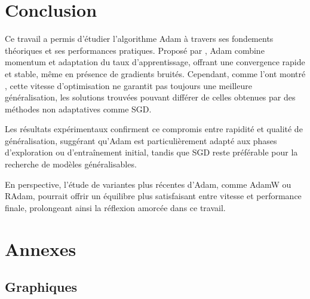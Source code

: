 \documentclass[a4paper,12pt]{article}
\begin{document}
\section{Conclusion}

Ce travail a permis d’étudier l’algorithme Adam à travers ses fondements
théoriques et ses performances pratiques. Proposé par \cite{kingma2014}, Adam combine momentum et adaptation du taux d’apprentissage,
offrant une convergence rapide et stable, même en présence de gradients
bruités. Cependant, comme l’ont montré \cite{wilson2017}, cette
vitesse d’optimisation ne garantit pas toujours une meilleure
généralisation, les solutions trouvées pouvant différer de celles
obtenues par des méthodes non adaptatives comme SGD.

Les résultats expérimentaux confirment ce compromis entre rapidité et
qualité de généralisation, suggérant qu’Adam est particulièrement adapté
aux phases d’exploration ou d’entraînement initial, tandis que SGD reste
préférable pour la recherche de modèles généralisables.

En perspective, l’étude de variantes plus récentes d’Adam, comme
AdamW ou RAdam, pourrait offrir un équilibre plus satisfaisant entre
vitesse et performance finale, prolongeant ainsi la réflexion amorcée
dans ce travail.


\newpage

\appendix
\section{Annexes}
\label{annexes}

\subsection{Graphiques}
\end{document}
